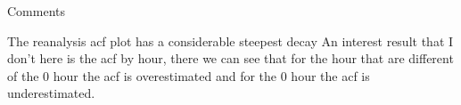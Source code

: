 \documentclass[xcolor=dvipsnames]{beamer}
\begin{document}
    \begin{frame}{Comments}
        \begin{outline}
            \1 The reanalysis acf plot has a considerable steepest decay
            \1 An interest result that I don't here is the acf by hour, there we can see that for the hour that are different of the 0 hour the acf is overestimated and for the 0 hour the acf is underestimated.
        \end{outline}
    \end{frame}   
\end{document}
